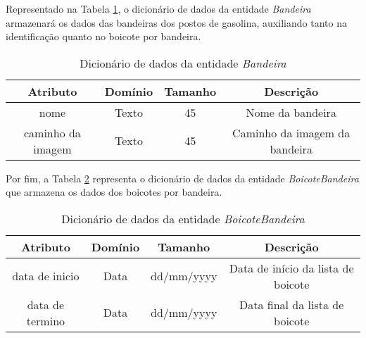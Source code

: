 Representado na Tabela \ref{dic:flag}, o dicionário de dados da entidade \textit{Bandeira} armazenará os dados das bandeiras dos postos de gasolina, auxiliando tanto na identificação quanto no boicote por bandeira.

\begin{table}[H]
\centering
\caption{Dicionário de dados da entidade \textit{Bandeira}}
\label{dic:flag}
\begin{tabular}{|c|c|c|c|}\hline
\textbf{Atributo} & \textbf{Domínio} & \textbf{Tamanho} & \textbf{Descrição}   \\ \hline
nome                      & Texto                           & 45                & Nome da bandeira \\ \hline
caminho da imagem                       & Texto                           & 45                & Caminho da imagem da bandeira\\ \hline

\end{tabular}
\end{table}

Por fim, a Tabela \ref{dic:flag_boycott} representa o dicionário de dados da entidade \textit{BoicoteBandeira} que armazena os dados dos boicotes por bandeira.

\begin{table}[H]
\centering
\caption{Dicionário de dados da entidade \textit{BoicoteBandeira}}
\label{dic:flag_boycott}
\begin{tabular}{|c|c|c|c|}\hline
\textbf{Atributo} & \textbf{Domínio} & \textbf{Tamanho} & \textbf{Descrição}   \\ \hline
data de inicio                      & Data                           & dd/mm/yyyy                & Data de início da lista de boicote \\ \hline
data de termino                       & Data                           & dd/mm/yyyy                & Data final da lista de boicote\\ \hline

\end{tabular}
\end{table}